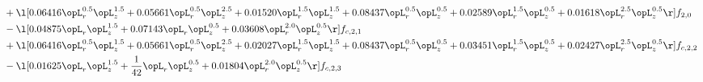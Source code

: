 \begin{alignat}{2}
& + \l[  0.06416 \opL_r^{0.5} \opL_z^{1.5} +  0.05661 \opL_r^{0.5} \opL_z^{2.5} +  0.01520 \opL_r^{1.5} \opL_z^{1.5} +  0.08437 \opL_r^{0.5} \opL_z^{0.5} +  0.02589 \opL_r^{1.5} \opL_z^{0.5} +  0.01618 \opL_r^{2.5} \opL_z^{0.5}  \r] f_{2,0} \nonumber \\ 
& - \l[  0.04875 \opL_r \opL_z^{1.5} +  0.07143 \opL_r \opL_z^{0.5} +  0.03608 \opL_r^{2.0} \opL_z^{0.5}  \r] f_{c,2,1} \nonumber \\ 
& + \l[  0.06416 \opL_r^{0.5} \opL_z^{1.5} +  0.05661 \opL_r^{0.5} \opL_z^{2.5} +  0.02027 \opL_r^{1.5} \opL_z^{1.5} +  0.08437 \opL_r^{0.5} \opL_z^{0.5} +  0.03451 \opL_r^{1.5} \opL_z^{0.5} +  0.02427 \opL_r^{2.5} \opL_z^{0.5}  \r] f_{c,2,2} \nonumber \\ 
& - \l[  0.01625 \opL_r \opL_z^{1.5} + \frac{1}{42} \opL_r \opL_z^{0.5} +  0.01804 \opL_r^{2.0} \opL_z^{0.5}  \r] f_{c,2,3} \nonumber \\ 
\end{alignat} 


